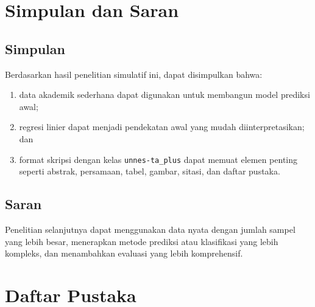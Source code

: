 \documentclass[skripsi]{unnes-ta_plus}
\begin{document}
\chapter{Simpulan dan Saran}

\section{Simpulan}
Berdasarkan hasil penelitian simulatif ini, dapat disimpulkan bahwa:
\begin{enumerate}
    \item data akademik sederhana dapat digunakan untuk membangun model prediksi awal;
    \item regresi linier dapat menjadi pendekatan awal yang mudah diinterpretasikan; dan
    \item format skripsi dengan kelas \texttt{unnes-ta\_plus} dapat memuat elemen penting seperti abstrak, persamaan, tabel, gambar, sitasi, dan daftar pustaka.
\end{enumerate}

\section{Saran}
Penelitian selanjutnya dapat menggunakan data nyata dengan jumlah sampel yang lebih besar, menerapkan metode prediksi atau klasifikasi yang lebih kompleks, dan menambahkan evaluasi yang lebih komprehensif.

\chapter*{Daftar Pustaka}
\printbibliography[heading=none]
\end{document}

